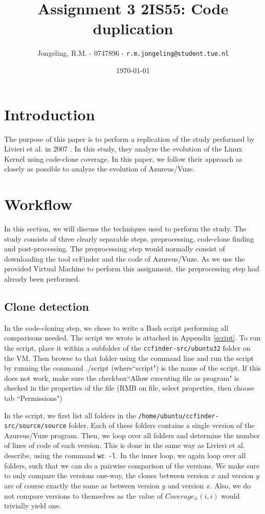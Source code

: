 \documentclass[a4paper,twoside, twocolumn, 11pt]{article}
\title{\vspace{-\baselineskip}\sffamily\bfseries Assignment 3 2IS55: Code duplication}
\author{Jongeling, R.M. - 0747896 - {\tt r.m.jongeling@student.tue.nl}}
\date{\today}
\numberwithin{equation}{section}
\begin{document}
\maketitle

\begin{abstract}

\end{abstract}

\section{Introduction}
The purpose of this paper is to perform a replication of the study performed by Livieri et al. in 2007 \cite{paper}.
In this study, they analyze the evolution of the Linux Kernel using code-clone coverage.
In this paper, we follow their approach as closely as possible to analyze the evolution of Azureus/Vuze.

\section{Workflow}
In this section, we will discuss the techniques used to perform the study.
The study consists of three clearly separable steps, preprocessing, code-clone finding and post-processing.
The preprocessing step would normally consist of downloading the tool ccFinder and the code of Azureus/Vuze.
As we use the provided Virtual Machine to perform this assignment, the preprocessing step had already been performed.

\subsection{Clone detection}
In the code-cloning step, we chose to write a Bash script performing all comparisons needed.
The script we wrote is attached in Appendix \ref{script}.
To run the script, place it within a subfolder of the \texttt{ccfinder-src/ubuntu32} folder on the VM. 
Then browse to that folder using the command line and run the script by running the command ./script (where``script") is the name of the script.
If this does not work, make sure the checkbox``Allow executing file as program" is checked in the properties of the file (RMB on file, select properties, then choose tab ``Permissions")

In the script, we first list all folders in the \texttt{/home/ubuntu/ccfinder-src/source/source} folder.
Each of these folders contains a single version of the Azureus/Vuze program.
Then, we loop over all folders and determine the number of lines of code of each version.
This is done in the same way as Livieri et al. describe, using the command \texttt{wc -l}.
In the inner loop, we again loop over all folders, such that we can do a pairwise comparison of the versions.
We make sure to only compare the versions one-way, the clones between version $x$ and version $y$ are of course exactly the same as between version $y$ and version $x$.
Also, we do not compare versions to themselves as the value of $Coverage_{ii}(i,i)$ would trivially yield one.
\end{document}
